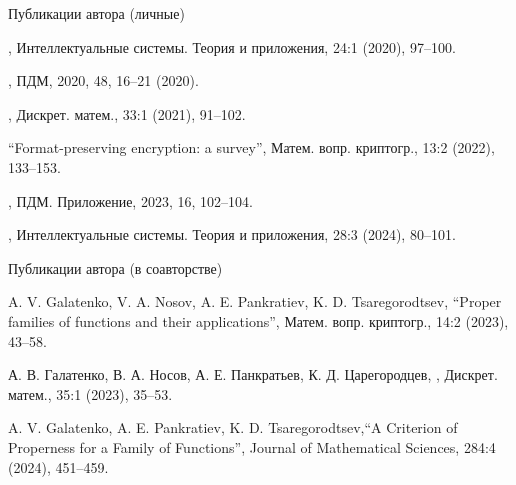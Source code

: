 \begin{frame}{Публикации автора (личные)}
    \begin{coloritemize}
        \item {}, Интеллектуальные системы. Теория и приложения, 24:1 (2020), 97--100.
        \item {}, ПДМ, 2020, 48,  16--21 (2020).
        \item {}, Дискрет. матем., 33:1 (2021), 91--102.
        \item ``Format-preserving encryption: a survey'', Матем. вопр. криптогр., 13:2 (2022),  133--153.
        \item {}, ПДМ. Приложение, 2023, 16,  102--104.
        \item {}, Интеллектуальные системы. Теория и приложения, 28:3 (2024), 80--101. 
    \end{coloritemize}
\end{frame}


\begin{frame}{Публикации автора (в соавторстве)}
    \begin{coloritemize}
        \item A. V. Galatenko, V. A. Nosov, A. E. Pankratiev, K. D. Tsaregorodtsev, ``Proper families of functions and their applications'', Матем. вопр. криптогр., 14:2 (2023),  43--58.
        \item А. В. Галатенко, В. А. Носов, А. Е. Панкратьев, К. Д. Царегородцев, , Дискрет. матем., 35:1 (2023),  35--53.
        \item A. V. Galatenko, A. E. Pankratiev, K. D. Tsaregorodtsev,``A Criterion of Properness for a Family of Functions'', Journal of Mathematical Sciences, 284:4 (2024), 451--459.
    \end{coloritemize}
\end{frame}